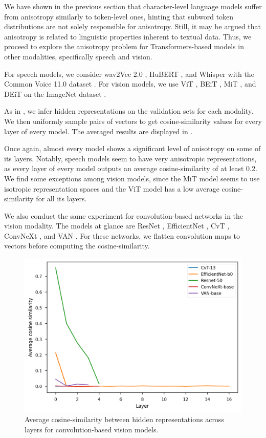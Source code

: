 We have shown in the previous section that character-level language models suffer from anisotropy similarly to token-level ones, hinting that subword token distributions are not solely responsible for anisotropy. Still, it may be argued that anisotropy is related to linguistic properties inherent to textual data. Thus, we proceed to explore the anisotropy problem for Transformers-based models in other modalities, specifically speech and vision.

For speech models, we consider wav2Vec 2.0 \citep{wav2vec}, HuBERT \citep{HuBERT}, and Whisper \citep{radford2022whisper} with the Common Voice 11.0 dataset \citep{commonvoice:2020}. For vision models, we use ViT \citep{Wu2020VisualTT}, BEiT \citep{beit-2021}, MiT \citep{segformer21}, and DEiT \citep{pmlr-v139-touvron21a} on the ImageNet dataset \citep{imagenet15russakovsky}.

As in , we infer hidden representations on the validation sets for each modality. We then uniformly sample pairs of vectors to get cosine-similarity values for every layer of every model. The averaged results are displayed in .

Once again, almost every model shows a significant level of anisotropy on some of its layers. Notably, speech models seem to have very anisotropic representations, as every layer of every model outputs an average cosine-similarity of at least $0.2$. We find some exceptions among vision models, since the MiT model seems to use isotropic representation spaces and the ViT model has a low average cosine-similarity for all its layers.

We also conduct the same experiment for convolution-based networks in the vision modality. The models at glance are ResNet \citep{he2016deep}, EfficientNet \citep{Tan2019EfficientNetRM}, CvT \citep{wu2021cvt}, ConvNeXt \citep{liu2022convnet}, and VAN \citep{guo2022visual}. For these networks, we flatten convolution maps to vectors before computing the cosine-similarity.

\begin{figure}[ht]
    \centering
    \includegraphics[width=0.6\linewidth]{sources/part_1/anisotropy/imgs/cosine_cnn_imagenet.png}
    \caption{Average cosine-similarity between hidden representations across layers for convolution-based vision models.}
    \label{fig:convbased}
\end{figure}

